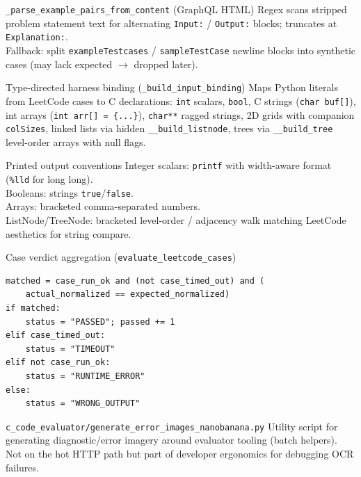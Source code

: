 \documentclass[aspectratio=169]{beamer}
\begin{document}
\begin{frame}{\texttt{\_parse\_example\_pairs\_from\_content} (GraphQL HTML)}
  \small
  Regex scans stripped problem statement text for alternating \texttt{Input:} / \texttt{Output:} blocks; truncates at \texttt{Explanation:}.\\
  Fallback: split \texttt{exampleTestcases} / \texttt{sampleTestCase} newline blocks into synthetic cases (may lack expected $\rightarrow$ dropped later).
\end{frame}

\begin{frame}{Type-directed harness binding (\texttt{\_build\_input\_binding})}
  \footnotesize
  Maps Python literals from LeetCode cases to C declarations:
  \texttt{int} scalars, \texttt{bool}, C strings (\texttt{char buf[]}), int arrays (\texttt{int arr[] = \{...\}}), \texttt{char**} ragged strings, 2D grids with companion \texttt{colSizes}, linked lists via hidden \texttt{\_\_build\_listnode}, trees via \texttt{\_\_build\_tree} level-order arrays with null flags.
\end{frame}

\begin{frame}{Printed output conventions}
  \small
  Integer scalars: \texttt{printf} with width-aware format (\texttt{\%lld} for long long).\\
  Booleans: strings \texttt{true}/\texttt{false}.\\
  Arrays: bracketed comma-separated numbers.\\
  ListNode/TreeNode: bracketed level-order / adjacency walk matching LeetCode aesthetics for string compare.
\end{frame}

\begin{frame}[fragile]{Case verdict aggregation (\texttt{evaluate\_leetcode\_cases})}
\begin{lstlisting}[style=py]
matched = case_run_ok and (not case_timed_out) and (
    actual_normalized == expected_normalized)
if matched:
    status = "PASSED"; passed += 1
elif case_timed_out:
    status = "TIMEOUT"
elif not case_run_ok:
    status = "RUNTIME_ERROR"
else:
    status = "WRONG_OUTPUT"
\end{lstlisting}
\end{frame}

\begin{frame}{\texttt{c\_code\_evaluator/generate\_error\_images\_nanobanana.py}}
  \small
  Utility script for generating diagnostic/error imagery around evaluator tooling (batch helpers). Not on the hot HTTP path but part of developer ergonomics for debugging OCR failures.
\end{frame}
\end{document}
